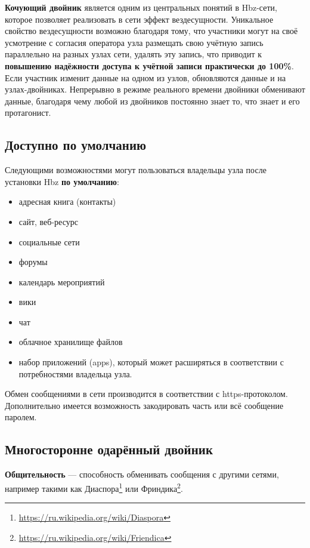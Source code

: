\documentclass[10pt, a5paper]{article}
\begin{document}
\textbf{Кочующий двойник} является одним из центральных понятий в Hbz-сети, которое позволяет реализовать в сети эффект вездесущности. Уникальное свойство  вездесущности возможно благодаря тому, что участники могут на своё усмотрение с согласия оператора узла размещать свою учётную запись параллельно на разных узлах сети, удалять эту запись, что приводит к \textbf{повышению надёжности доступа к учётной записи практически до 100\%}. Если участник изменит данные на одном из узлов, обновляются данные и на узлах-двойниках. Непрерывно в режиме реального времени двойники обменивают данные, благодаря чему любой из двойников постоянно знает то, что знает и его протагонист.

\subsection*{Доступно по умолчанию}

Следующими возможностями могут пользоваться владельцы узла после установки Hbz \textbf{по умолчанию}:

\begin{itemize}
  \item адресная книга (контакты)
  \item сайт, веб-ресурс
  \item социальные сети
  \item форумы
  \item календарь мероприятий
  \item вики
  \item чат
  \item облачное хранилище файлов
  \item набор приложений (apps), который может расширяться в соответствии с потребностями владельца узла.
\end{itemize}

Обмен сообщениями в сети производится в соответствии с https-протоколом. Дополнительно имеется возможность закодировать \linebreak часть или всё сообщение паролем.

\subsection*{Многосторонне одарённый двойник}

\textbf{Общительность} --- способность обменивать сообщения с другими сетями, например такими как Диаспора\footnote{\url{https://ru.wikipedia.org/wiki/Diaspora}} или Фриндика\footnote{\url{https://ru.wikipedia.org/wiki/Friendica}}.
\end{document}
